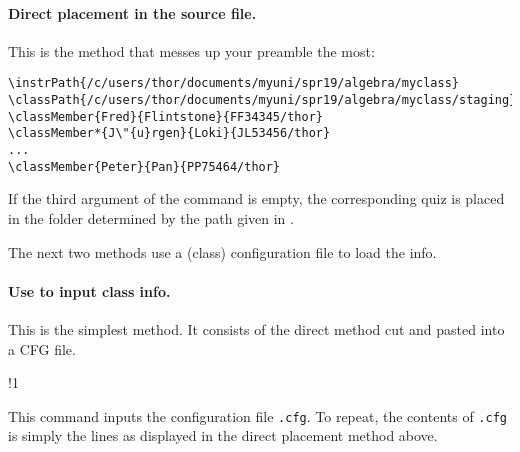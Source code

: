 \documentclass{article}
\edef\amtIndent{\the\parindent}
\begin{document}
\paragraph*{Direct placement in the source file.}
This is the method that messes up your preamble the most:
\begin{Verbatim}[xleftmargin=\amtIndent,fontsize=\small]
\instrPath{/c/users/thor/documents/myuni/spr19/algebra/myclass}
\classPath{/c/users/thor/documents/myuni/spr19/algebra/myclass/staging}
\classMember{Fred}{Flintstone}{FF34345/thor}
\classMember*{J\"{u}rgen}{Loki}{JL53456/thor}
...
\classMember{Peter}{Pan}{PP75464/thor}
\end{Verbatim}
If the third argument of the  command is empty, the corresponding
quiz is placed in the folder determined by the path given in
.

\newtopic\noindent
The next two methods use a (class) configuration file to load the info.

\paragraph*{Use  to input class info.} This is the simplest method.
It consists of the direct method cut and pasted into a CFG file.
\bVerb\small{}%
\setlength{\eflength}{\bxSize}%
\def\1{\rlap{\hskip\eflength\%\textsf{ preamble only}}}%
\begin{dCmd}[commandchars=!()]{\bxSize}
!1
\end{dCmd}
\eVerb This command inputs the configuration file
\texttt{.cfg}. To repeat, the contents of
\texttt{.cfg} is simply the lines as displayed in the direct
placement method above.
\end{document}

